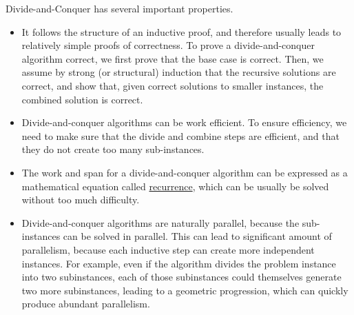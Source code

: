 \begin{cluster}
\label{grp:grm:design::dc::properties-of-divide-and-conquer-algorithms}

\begin{gram}
\label{grm:design::dc::properties-of-divide-and-conquer-algorithms}
Divide-and-Conquer has several important properties.  

\begin{itemize}
\item  It follows the structure of an inductive proof, and therefore
usually leads to relatively simple proofs of correctness. 
To prove a divide-and-conquer algorithm correct, we first prove that the
base case is correct.  Then, we assume by strong (or structural)
induction that the recursive solutions are correct, and show that,
given correct solutions to smaller instances, the combined solution is
correct.

\item Divide-and-conquer algorithms can be work efficient.
To ensure efficiency, we need to make sure that the divide and combine
steps are efficient, and that they do not create too many
sub-instances.

\item The work and span for a divide-and-conquer algorithm can be
  expressed as a mathematical equation called \href{ch:analysis::recurrences}{recurrence},
which can be usually be solved without too much difficulty.

\item Divide-and-conquer algorithms are naturally parallel, because
  the sub-instances can be solved in parallel.  This can lead to
  significant amount of parallelism, because each inductive step can
  create more independent instances. For example, even if the
  algorithm divides the problem instance into two subinstances, each
  of those subinstances could themselves generate two more
  subinstances, leading to a geometric progression, which can quickly
  produce abundant parallelism.
\end{itemize}

\end{gram}
\end{cluster}

